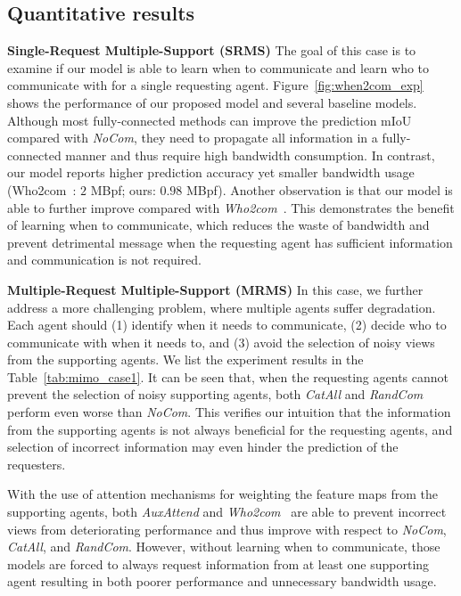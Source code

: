 \subsection{Quantitative results}

\noindent
\textbf{Single-Request Multiple-Support (SRMS)}
The goal of this case is to examine if our model is able to learn when to communicate and learn who to communicate with for a single requesting agent. 
Figure~\ref{fig:when2com_exp} shows the performance of our proposed model and several baseline models. 
Although most fully-connected methods can improve the prediction mIoU compared with \textit{NoCom}, they need to propagate all information in a fully-connected manner and thus require high bandwidth consumption. 
In contrast, our model reports higher prediction accuracy yet smaller bandwidth usage (Who2com~\cite{liu2020who2com}: $2$ MBpf; ours: $0.98$ MBpf).
Another observation is that our model is able to further improve compared with \textit{Who2com}~\cite{liu2020who2com}. 
This demonstrates the benefit of learning when to communicate, which reduces the waste of bandwidth and prevent detrimental message when the requesting agent has sufficient information and communication is not required. 

\noindent
\textbf{Multiple-Request Multiple-Support (MRMS)}
In this case, we further address a more challenging problem, where multiple agents suffer degradation. 
Each agent should (1) identify when it needs to communicate, (2) decide who to communicate with when it needs to, and (3) avoid the selection of noisy views from the supporting agents. 
We list the experiment results in the Table~\ref{tab:mimo_case1}. 
It can be seen that, when the requesting agents cannot prevent the selection of noisy supporting agents, both \textit{CatAll} and \textit{RandCom} perform even worse than \textit{NoCom}. 
This verifies our intuition that the information from the supporting agents is not always beneficial for the requesting agents, and selection of incorrect information may even hinder the prediction of the requesters.

With the use of attention mechanisms for weighting the feature maps from the supporting agents, both \textit{AuxAttend} and \textit{Who2com}~\cite{liu2020who2com} are able to prevent incorrect views from deteriorating performance and thus improve with respect to \textit{NoCom}, \textit{CatAll}, and \textit{RandCom}. 
However, without learning when to communicate, those models are forced to always request information from at least one supporting agent resulting in both poorer performance and unnecessary bandwidth usage. 

